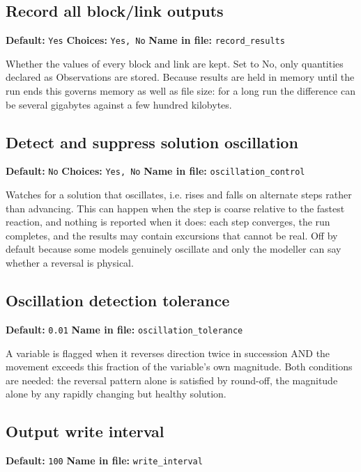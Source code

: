 \documentclass[11pt]{article}
\begin{document}
\subsection{Record all block/link outputs}
{\small \textbf{Default:} \texttt{Yes} \quad\textbullet\quad \textbf{Choices:} \texttt{Yes, No} \quad\textbullet\quad \textbf{Name in file:} \texttt{record\_\allowbreak{}results}}

Whether the values of every block and link are kept. Set to No, only quantities declared as Observations are stored. Because results are held in memory until the run ends this governs memory as well as file size: for a long run the difference can be several gigabytes against a few hundred kilobytes.
\subsection{Detect and suppress solution oscillation}
{\small \textbf{Default:} \texttt{No} \quad\textbullet\quad \textbf{Choices:} \texttt{Yes, No} \quad\textbullet\quad \textbf{Name in file:} \texttt{oscillation\_\allowbreak{}control}}

Watches for a solution that oscillates, i.e. rises and falls on alternate steps rather than advancing. This can happen when the step is coarse relative to the fastest reaction, and nothing is reported when it does: each step converges, the run completes, and the results may contain excursions that cannot be real. Off by default because some models genuinely oscillate and only the modeller can say whether a reversal is physical.
\subsection{Oscillation detection tolerance}
{\small \textbf{Default:} \texttt{0.\allowbreak{}01} \quad\textbullet\quad \textbf{Name in file:} \texttt{oscillation\_\allowbreak{}tolerance}}

A variable is flagged when it reverses direction twice in succession AND the movement exceeds this fraction of the variable's own magnitude. Both conditions are needed: the reversal pattern alone is satisfied by round-off, the magnitude alone by any rapidly changing but healthy solution.
\subsection{Output write interval}
{\small \textbf{Default:} \texttt{100} \quad\textbullet\quad \textbf{Name in file:} \texttt{write\_\allowbreak{}interval}}
\end{document}

